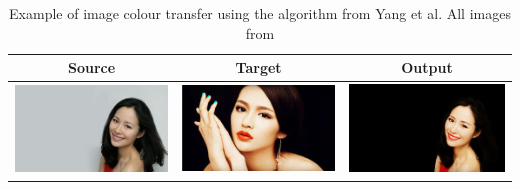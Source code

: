 \begin{table}[H]
    \centering
    \caption{Example of image colour transfer using the algorithm from Yang et al. All images from \cite{yang_2017_semantic} \label{tab:yang_demo}}
\begin{tabular}{|c|c|c|}
    \hline
    Source & Target & Output \\
    \hline
  \begin{minipage}{.29\textwidth}
    \includegraphics[width=\textwidth,height=\textheight,keepaspectratio]{images/yang_orig1}
  \end{minipage} & 
  \begin{minipage}{.29\textwidth}
    \includegraphics[width=\textwidth,height=\textheight,keepaspectratio]{images/yang_target1}
  \end{minipage} & 
  \begin{minipage}{.29\textwidth}
    \includegraphics[width=\textwidth,height=\textheight,keepaspectratio]{images/yang_result1}

\end{minipage}
\end{tabular}
\end{table}

